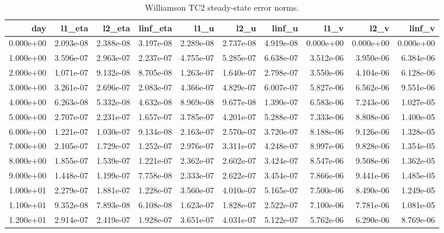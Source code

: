 \begin{table}[htbp]
\centering
{}
\begin{tabular}{rrrrrrrrrr}
\toprule
day & l1\_eta & l2\_eta & linf\_eta & l1\_u & l2\_u & linf\_u & l1\_v & l2\_v & linf\_v \\
\midrule
0.000e+00 & 2.093e-08 & 2.388e-08 & 3.197e-08 & 2.289e-08 & 2.737e-08 & 4.919e-08 & 0.000e+00 & 0.000e+00 & 0.000e+00 \\
1.000e+00 & 3.596e-07 & 2.963e-07 & 2.237e-07 & 4.755e-07 & 5.285e-07 & 6.638e-07 & 3.512e-06 & 3.950e-06 & 6.384e-06 \\
2.000e+00 & 1.071e-07 & 9.132e-08 & 8.705e-08 & 1.263e-07 & 1.640e-07 & 2.798e-07 & 3.550e-06 & 4.104e-06 & 6.128e-06 \\
3.000e+00 & 3.261e-07 & 2.696e-07 & 2.083e-07 & 4.366e-07 & 4.829e-07 & 6.007e-07 & 5.827e-06 & 6.562e-06 & 9.551e-06 \\
4.000e+00 & 6.263e-08 & 5.332e-08 & 4.632e-08 & 8.969e-08 & 9.677e-08 & 1.390e-07 & 6.583e-06 & 7.243e-06 & 1.027e-05 \\
5.000e+00 & 2.707e-07 & 2.231e-07 & 1.657e-07 & 3.785e-07 & 4.201e-07 & 5.288e-07 & 7.333e-06 & 8.808e-06 & 1.400e-05 \\
6.000e+00 & 1.221e-07 & 1.030e-07 & 9.134e-08 & 2.163e-07 & 2.570e-07 & 3.720e-07 & 8.188e-06 & 9.126e-06 & 1.328e-05 \\
7.000e+00 & 2.105e-07 & 1.729e-07 & 1.252e-07 & 2.976e-07 & 3.311e-07 & 4.248e-07 & 8.997e-06 & 9.828e-06 & 1.354e-05 \\
8.000e+00 & 1.855e-07 & 1.539e-07 & 1.221e-07 & 2.362e-07 & 2.602e-07 & 3.424e-07 & 8.547e-06 & 9.508e-06 & 1.362e-05 \\
9.000e+00 & 1.448e-07 & 1.199e-07 & 7.758e-08 & 2.333e-07 & 2.622e-07 & 3.454e-07 & 7.866e-06 & 9.441e-06 & 1.485e-05 \\
1.000e+01 & 2.279e-07 & 1.881e-07 & 1.228e-07 & 3.560e-07 & 4.010e-07 & 5.165e-07 & 7.500e-06 & 8.490e-06 & 1.249e-05 \\
1.100e+01 & 9.352e-08 & 7.893e-08 & 6.108e-08 & 1.623e-07 & 1.828e-07 & 2.522e-07 & 7.100e-06 & 7.781e-06 & 1.081e-05 \\
1.200e+01 & 2.914e-07 & 2.419e-07 & 1.928e-07 & 3.651e-07 & 4.031e-07 & 5.122e-07 & 5.762e-06 & 6.290e-06 & 8.769e-06 \\
\bottomrule
\end{tabular}
\caption{Williamson TC2 steady-state error norms.}
\end{table}
